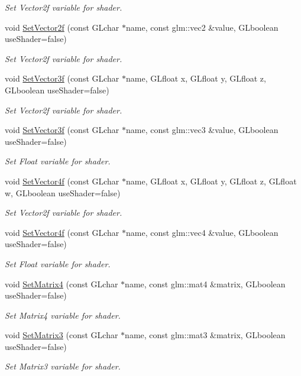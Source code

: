 \begin{DoxyCompactItemize}
\begin{DoxyCompactList}\small\item\em Set Vector2f variable for shader. \end{DoxyCompactList}\item 
void \mbox{\hyperlink{class_shader_ae4c81083a20b2790c15d9fbc8e8c7b38}{Set\+Vector2f}} (const G\+Lchar $\ast$name, const glm\+::vec2 \&value, G\+Lboolean use\+Shader=false)
\begin{DoxyCompactList}\small\item\em Set Vector2f variable for shader. \end{DoxyCompactList}\item 
void \mbox{\hyperlink{class_shader_ad7e3033cb0250e83bc118c0677ef678a}{Set\+Vector3f}} (const G\+Lchar $\ast$name, G\+Lfloat x, G\+Lfloat y, G\+Lfloat z, G\+Lboolean use\+Shader=false)
\begin{DoxyCompactList}\small\item\em Set Vector2f variable for shader. \end{DoxyCompactList}\item 
void \mbox{\hyperlink{class_shader_af564b9fd25379dafacba930fc414dae8}{Set\+Vector3f}} (const G\+Lchar $\ast$name, const glm\+::vec3 \&value, G\+Lboolean use\+Shader=false)
\begin{DoxyCompactList}\small\item\em Set Float variable for shader. \end{DoxyCompactList}\item 
void \mbox{\hyperlink{class_shader_a9f0f5bf4f960f299e6d7f69ecc612474}{Set\+Vector4f}} (const G\+Lchar $\ast$name, G\+Lfloat x, G\+Lfloat y, G\+Lfloat z, G\+Lfloat w, G\+Lboolean use\+Shader=false)
\begin{DoxyCompactList}\small\item\em Set Vector2f variable for shader. \end{DoxyCompactList}\item 
void \mbox{\hyperlink{class_shader_a2d24719a9edc9541bd01cf230f0b3a12}{Set\+Vector4f}} (const G\+Lchar $\ast$name, const glm\+::vec4 \&value, G\+Lboolean use\+Shader=false)
\begin{DoxyCompactList}\small\item\em Set Float variable for shader. \end{DoxyCompactList}\item 
void \mbox{\hyperlink{class_shader_a0c8e93a639ef45644c1e27043be586b2}{Set\+Matrix4}} (const G\+Lchar $\ast$name, const glm\+::mat4 \&matrix, G\+Lboolean use\+Shader=false)
\begin{DoxyCompactList}\small\item\em Set Matrix4 variable for shader. \end{DoxyCompactList}\item 
void \mbox{\hyperlink{class_shader_a70230092a3435a7c0a05736225bb0dd1}{Set\+Matrix3}} (const G\+Lchar $\ast$name, const glm\+::mat3 \&matrix, G\+Lboolean use\+Shader=false)
\begin{DoxyCompactList}\small\item\em Set Matrix3 variable for shader. \end{DoxyCompactList}\end{DoxyCompactItemize}
